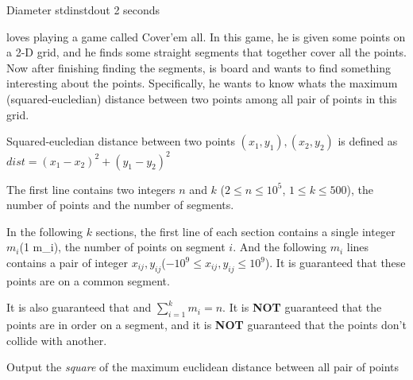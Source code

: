 \begin{problem}{Diameter}
{stdin}{stdout}
{2 seconds}{}{}

\pittoresque loves playing a game called Cover'em all. In this game, he is given some points on a 2-D grid, and he finds some straight segments that together cover all the points. Now after finishing finding the segments, \pittoresque is board and wants to find something interesting about the points. Specifically, he wants to know whats the maximum (squared-eucledian) distance between two points among all pair of points in this grid.

Squared-eucledian distance between two points $(x_1, y_1), (x_2, y_2)$ is defined as $dist = (x_1 - x_2)^2 + (y_1 - y_2)^2$

\InputFile

The first line contains two integers $n$ and $k$ ($2 \le n \le 10^5$, $1 \le k \le 500$), the number of points and the number of segments.

In the following $k$ sections, the first line of each section contains a single integer $m_i$(1 \le m_i), the number of points on segment $i$. And the following $m_i$ lines contains a pair of integer $x_{ij}, y_{ij}$($-10^9 \le x_{ij}, y_{ij} \le 10^9$). It is guaranteed that these points are on a common segment.

It is also guaranteed that and $\sum_{i = 1}^{k} m_i = n$. It is \textbf{NOT} guaranteed that the points are in order on a segment, and it is \textbf{NOT} guaranteed that the points don't collide with another. 

\OutputFile

Output the \textit{square} of the maximum  euclidean distance between all pair of points

\Examples

\begin{example}
%
\end{example}

\begin{example}
%
\end{example}



\end{problem}